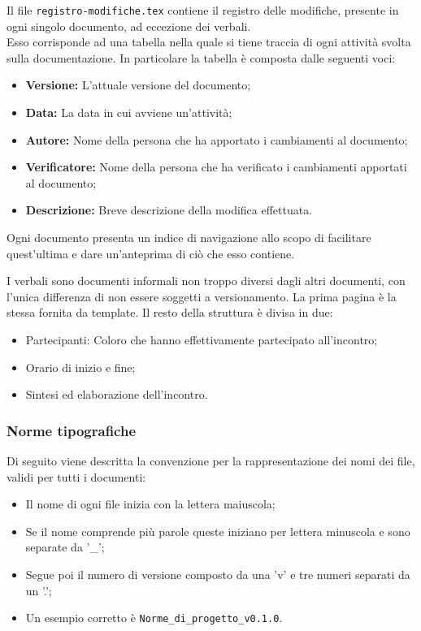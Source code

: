         Il file \texttt{registro-modifiche.tex} contiene il registro delle modifiche, presente in ogni singolo documento, ad eccezione dei verbali. \\
        Esso corrisponde ad una tabella nella quale si tiene traccia di ogni attività svolta sulla documentazione.
        In particolare la tabella è composta dalle seguenti voci:
        \begin{itemize}
          \item \textbf{Versione:} L'attuale versione del documento;
          \item \textbf{Data:} La data in cui avviene un'attività;
          \item \textbf{Autore:} Nome della persona che ha apportato i cambiamenti al documento;
          \item \textbf{Verificatore:} Nome della persona che ha verificato i cambiamenti apportati al documento;
          \item \textbf{Descrizione:} Breve descrizione della modifica effettuata.
        \end{itemize}

        Ogni documento presenta un indice di navigazione allo scopo di facilitare quest'ultima e
        dare un'anteprima di ciò che esso contiene.


        I verbali sono documenti informali non troppo diversi dagli altri documenti, con l'unica differenza
        di non essere soggetti a versionamento.
        La prima pagina è la stessa fornita da template.
        Il resto della struttura è divisa in due:
        \begin{itemize}
          \item Partecipanti: Coloro che hanno effettivamente partecipato all'incontro;
          \item Orario di inizio e fine;
          \item Sintesi ed elaborazione dell'incontro.
        \end{itemize}

\subsubsection{Norme tipografiche}

    Di seguito viene descritta la convenzione per la rappresentazione dei nomi dei file, validi per tutti i documenti:
    \begin{itemize}
      \item Il nome di ogni file inizia con la lettera maiuscola;
      \item Se il nome comprende più parole queste iniziano per lettera minuscola e sono separate da '\_';
      \item Segue poi il numero di versione composto da una 'v' e tre numeri separati da un '.';
      \item Un esempio corretto è \texttt{Norme\_di\_progetto\_v0.1.0}.
    \end{itemize}


